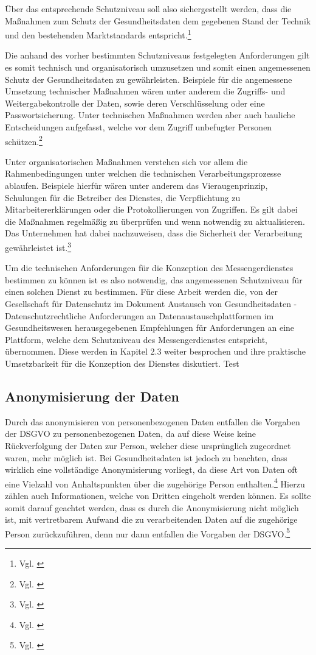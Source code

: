 Über das entsprechende Schutzniveau soll also sichergestellt werden, dass die Maßnahmen zum Schutz der Gesundheitsdaten dem gegebenen Stand der Technik und den bestehenden Marktstandards entspricht.\footnote{Vgl. \cite[S. 740]{Kuhnl2018}}

Die anhand des vorher bestimmten Schutzniveaus festgelegten Anforderungen gilt es somit technisch und organisatorisch umzusetzen und somit einen angemessenen Schutz der Gesundheitsdaten zu gewährleisten. Beispiele für die angemessene Umsetzung technischer Maßnahmen wären unter anderem die Zugriffs- und Weitergabekontrolle der Daten, sowie deren Verschlüsselung oder eine Passwortsicherung. Unter technischen Maßnahmen werden aber auch bauliche Entscheidungen aufgefasst, welche vor dem Zugriff unbefugter Personen schützen.\footnote{Vgl. \cite[S. 41 ff.]{Bundesaerztekammer2020}}

Unter organisatorischen Maßnahmen verstehen sich vor allem die Rahmenbedingungen unter welchen die technischen Verarbeitungsprozesse ablaufen. Beispiele hierfür wären unter anderem das Vieraugenprinzip, Schulungen für die Betreiber des Dienstes, die Verpflichtung zu Mitarbeitererklärungen oder die Protokollierungen von Zugriffen. Es gilt dabei die Maßnahmen regelmäßig zu überprüfen und wenn notwendig zu aktualisieren. Das Unternehmen hat dabei nachzuweisen, dass die Sicherheit der Verarbeitung gewährleistet ist.\footnote{Vgl. \cite[S. 42 ff.]{Bundesaerztekammer2020}}

Um die technischen Anforderungen für die Konzeption des Messengerdienstes bestimmen zu können ist es also notwendig, das angemessenen Schutzniveau für einen solchen Dienst zu bestimmen. Für diese Arbeit werden die, von der Gesellschaft für Datenschutz im Dokument \glqq Austausch von Gesundheitsdaten -  Datenschutzrechtliche Anforderungen an Datenaustauschplattformen im Gesundheitswesen\grqq{} herausgegebenen Empfehlungen für Anforderungen an eine Plattform, welche dem Schutzniveau des Messengerdienstes entspricht, übernommen. Diese werden in Kapitel 2.3 weiter besprochen und ihre praktische Umsetzbarkeit für die Konzeption des Dienstes diskutiert. 
Test

\subsection{Anonymisierung der Daten}\label{subsection:add}
Durch das anonymisieren von personenbezogenen Daten entfallen die Vorgaben der DSGVO zu personenbezogenen Daten, da auf diese Weise keine Rückverfolgung der Daten zur Person, welcher diese ursprünglich zugeordnet waren, mehr möglich ist. Bei Gesundheitsdaten ist jedoch zu beachten, dass wirklich eine vollständige Anonymisierung vorliegt, da diese Art von Daten oft eine Vielzahl von Anhaltspunkten über die zugehörige Person enthalten.\footnote{Vgl. \cite[S. 429 ff.]{Voigt2018}}
Hierzu zählen auch Informationen, welche von Dritten eingeholt werden können. Es sollte somit darauf geachtet werden, dass es durch die Anonymisierung nicht möglich ist, mit vertretbarem Aufwand die zu verarbeitenden Daten auf die zugehörige Person zurückzuführen, denn nur dann entfallen die Vorgaben der DSGVO.\footnote{Vgl. \cite[S. 5 f.]{Bundesaerztekammer2020}}

